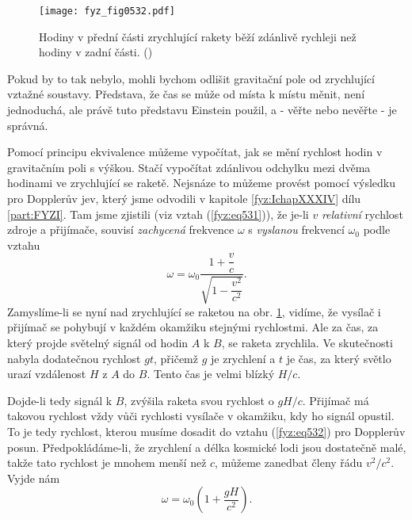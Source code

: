     \begin{figure}[ht!] %
      \centering
      \texttt{[image: fyz\_fig0532.pdf]}
      \caption{Hodiny v přední části zrychlující rakety běží zdánlivě rychleji než hodiny v zadní 
               části. (\cite[s.~787]{Feynman02})}
      \label{fyz:fig0532}
    \end{figure}
    
    Pokud by to tak nebylo, mohli bychom odlišit gravitační pole od zrychlující vztažné soustavy. 
    Představa, že čas se může od místa k místu měnit, není jednoduchá, ale právě tuto představu 
    Einstein použil, a - věřte nebo nevěřte - je správná.
    
    Pomocí principu ekvivalence můžeme vypočítat, jak se mění rychlost hodin v gravitačním poli s 
    výškou. Stačí vypočítat zdánlivou odchylku mezi dvěma hodinami ve zrychlující se raketě. 
    Nejsnáze to můžeme provést pomocí výsledku pro Dopplerův jev, který jsme odvodili v kapitole 
    \ref{fyz:IchapXXXIV} dílu \ref{part:FYZI}. Tam jsme zjistili (viz vztah (\ref{fyz:eq531})), že 
    je-li \(v\) \emph{relativní} rychlost zdroje a přijímače, souvisí \emph{zachycená} frekvence 
    \(\omega\) s \emph{vyslanou} frekvencí \(\omega_0\) podle vztahu
    \begin{equation}\label{fyz:eq532}
      \omega = \omega_0\dfrac{1+\dfrac{v}{c}}{\sqrt{1-\dfrac{v^2}{c^2}}}.
    \end{equation}
    Zamyslíme-li se nyní nad zrychlující se raketou na obr. \ref{fyz:fig0532}, vidíme, že vysílač i 
    přijímač se pohybují v každém okamžiku stejnými rychlostmi. Ale za čas, za který projde 
    světelný signál od hodin \(A\) k \(B\), se raketa zrychlila. Ve skutečnosti nabyla dodatečnou 
    rychlost \(gt\), přičemž \(g\) je zrychlení a \(t\) je čas, za který světlo urazí vzdálenost 
    \(H\) z \(A\) do \(B\). Tento čas je velmi blízký \(H/c\). 
    
    Dojde-li tedy signál k \(B\), zvýšila raketa svou rychlost o \(gH/c\). Přijímač má takovou 
    rychlost vždy vůči rychlosti vysílače v okamžiku, kdy ho signál opustil. To je tedy rychlost, 
    kterou musíme dosadit do vztahu (\ref{fyz:eq532}) pro Dopplerův posun. Předpokládáme-li, že 
    zrychlení a délka kosmické lodi jsou dostatečně malé, takže tato rychlost je mnohem menší než 
    \(c\), můžeme zanedbat členy řádu \(v^2/c^2\). Vyjde nám
    \begin{equation}\label{fyz:eq533}
      \omega = \omega_0\left(1 + \dfrac{gH}{c^2}\right).
    \end{equation}
    

